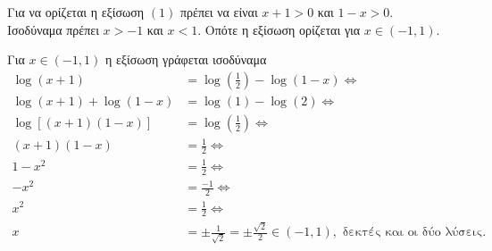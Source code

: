 \begin{alist}
\item Για να ορίζεται η εξίσωση $(1)$ πρέπει να είναι $x + 1 > 0$ και $1 - x > 0$. \\
Ισοδύναμα πρέπει $x > -1$ και $x < 1$. Οπότε η εξίσωση ορίζεται για $x \in (-1, 1)$.
\item Για $x \in (-1, 1)$ η εξίσωση γράφεται ισοδύναμα 
\begin{align*}
\log(x + 1) &= \log\left(\frac{1}{2}\right) - \log(1 - x) \Leftrightarrow \\
\log(x + 1) + \log(1 - x) &= \log(1) - \log(2) \Leftrightarrow \\
\log[(x + 1)(1 - x)] &= \log\left(\frac{1}{2}\right) \Leftrightarrow \\
(x + 1)(1 - x) &= \frac{1}{2} \Leftrightarrow \\
1 - x^2 &= \frac{1}{2} \Leftrightarrow \\
-x^2 &= \frac{-1}{2} \Leftrightarrow \\
x^2 &= \frac{1}{2} \Leftrightarrow \\
x &= \pm\frac{1}{\sqrt{2}} = \pm\frac{\sqrt{2}}{2} \in (-1, 1), \text{ δεκτές και οι δύο λύσεις.}
\end{align*}
\end{alist}

